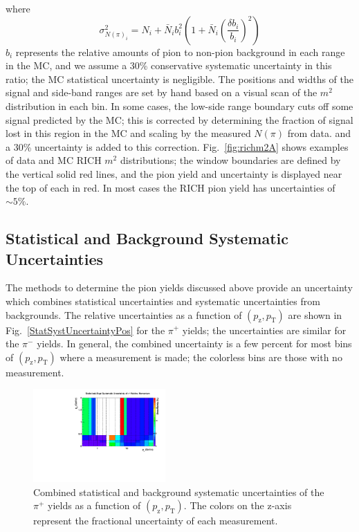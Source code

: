 \documentclass[%
aps, prd, reprint, show pacs, preprint numbers, ams math, amssymb, superscriptaddress, linenumbers]{revtex4-1}
\def\pzpt{$(p_\mathrm{z},p_\mathrm{T})$\xspace}
\begin{document}
where 
\begin{equation}
\sigma^2_{N(\pi)_i} = N_i + \bar{N}_ib_i^2\left(1 + \bar{N}_i\left(\frac{\delta b_i}{b_i}\right)^2\right)
\end{equation}
$b_i$ represents the relative amounts of pion to non-pion background in each range in the MC, and we assume  a 30\% conservative systematic uncertainty in this ratio; the MC statistical uncertainty is negligible.  The positions and widths of the signal and side-band ranges are set by hand based on a visual scan of the $m^2$ distribution in each bin.  In some cases, the low-side range boundary cuts off some signal predicted by the MC; this is corrected  by determining the fraction of signal lost in this region in the MC and scaling by the measured $N(\pi)$ from data.
and a 30\% uncertainty is added to this correction.  Fig.~\ref{fig:richm2A} shows examples of data and MC RICH $m^2$ distributions; the window boundaries are defined by the vertical solid red lines, and the pion yield and uncertainty is displayed near the top of each in red.  In most cases the RICH pion yield has uncertainties of $\sim 5\%$.  

\subsection{Statistical and Background Systematic Uncertainties}

The methods to determine the pion yields discussed above provide an 
uncertainty which combines statistical uncertainties and systematic uncertainties from backgrounds.  The relative 
uncertainties as a function of \pzpt are shown in Fig.~\ref{StatSystUncertaintyPos} for the $\pi^+$ yields; the uncertainties are similar for the $\pi^-$ yields.  In general, the combined uncertainty is a few percent for most bins of \pzpt where a measurement is made; the colorless bins are those with no measurement.

\begin{figure}[!ht] %
   \centering
   \includegraphics[width=0.45\textwidth]{StatSystUncertaintyPos} 
   \caption{Combined statistical and background systematic uncertainties of the $\pi^+$ yields as a function of \pzpt.  The colors on the z-axis represent the fractional uncertainty of each measurement.}
   \label{fig:StatSyst}
\end{figure}
\end{document}
